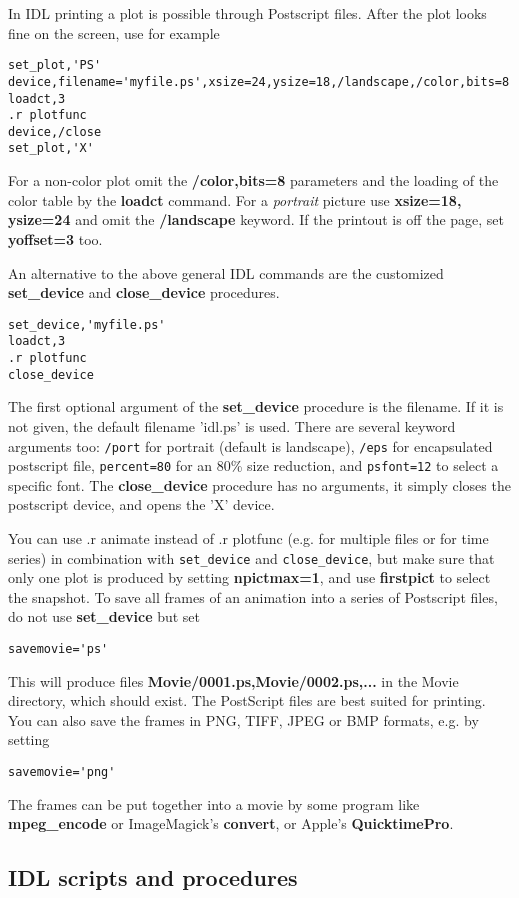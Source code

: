 In IDL printing a plot is possible through Postscript files.
After the plot looks fine on the screen, use for example
\begin{verbatim}
set_plot,'PS'
device,filename='myfile.ps',xsize=24,ysize=18,/landscape,/color,bits=8
loadct,3
.r plotfunc
device,/close
set_plot,'X'
\end{verbatim}
For a non-color plot omit the {\bf /color,bits=8} parameters and the 
loading of the color table by the {\bf loadct} command. For a {\it portrait}
picture use {\bf xsize=18, ysize=24} and omit the {\bf /landscape} keyword.
If the printout is off the page, set {\bf yoffset=3} too.

An alternative to the above general IDL commands are  
the customized {\bf set\_device} and {\bf close\_device} procedures.
\begin{verbatim}
set_device,'myfile.ps'
loadct,3
.r plotfunc
close_device
\end{verbatim}
The first optional argument of the {\bf set\_device} procedure is the filename.
If it is not given, the default filename 'idl.ps' is used.
There are several keyword arguments too: {\tt /port} for
portrait (default is landscape), {\tt /eps} for encapsulated postscript
file, {\tt percent=80} for an 80\% size reduction, and {\tt psfont=12}
to select a specific font. The {\bf close\_device} procedure
has no arguments, it simply closes the postscript device, and opens the
'X' device.

You can use .r animate instead of .r plotfunc (e.g. for multiple files or 
for time series) in combination with {\tt set\_device} and 
{\tt close\_device}, but make sure that only one plot is produced by setting
{\bf npictmax=1}, and use {\bf firstpict} to select the snapshot.
To save all frames of an animation into a series of Postscript files, 
do not use {\bf set\_device} but set
\begin{verbatim}
savemovie='ps'
\end{verbatim}
This will produce files {\bf Movie/0001.ps,Movie/0002.ps,...} 
in the Movie directory, which should exist. The PostScript files 
are best suited for printing.
You can also save the frames in PNG, TIFF, JPEG or BMP formats, e.g.
by setting 
\begin{verbatim}
savemovie='png'
\end{verbatim}
The frames can be put together into a movie by some program like
{\bf mpeg\_encode} or ImageMagick's {\bf convert}, or 
Apple's {\bf QuicktimePro}. 

\subsection{IDL scripts and procedures \label{s-idl-script}}

